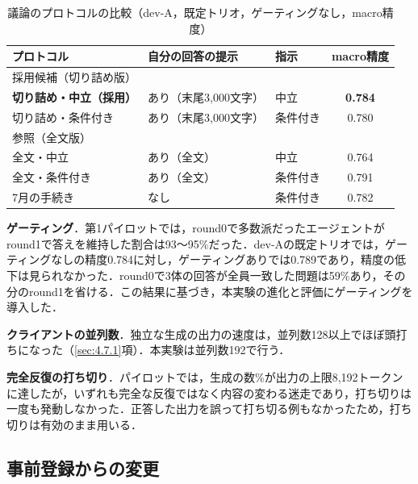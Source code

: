 \begin{table}[htbp]
\caption{議論のプロトコルの比較（dev-A，既定トリオ，ゲーティングなし，macro精度）}
\label{tab:4.6}
\centering
\small
\begin{tabular}{|l|l|l|c|}
\hline
プロトコル & 自分の回答の提示 & 指示 & macro精度 \\
\hline
\multicolumn{4}{|l|}{採用候補（切り詰め版）} \\
\hline
\textbf{切り詰め・中立（採用）} & あり（末尾3,000文字） & 中立 & \textbf{0.784} \\
切り詰め・条件付き & あり（末尾3,000文字） & 条件付き & 0.780 \\
\hline
\multicolumn{4}{|l|}{参照（全文版）} \\
\hline
全文・中立 & あり（全文） & 中立 & 0.764 \\
全文・条件付き & あり（全文） & 条件付き & 0.791 \\
7月の手続き & なし & 条件付き & 0.782 \\
\hline
\end{tabular}
\end{table}

\textbf{ゲーティング}．第1パイロットでは，round0で多数派だったエージェントがround1で答えを維持した割合は93〜95\%だった．dev-Aの既定トリオでは，ゲーティングなしの精度0.784に対し，ゲーティングありでは0.789であり，精度の低下は見られなかった．round0で3体の回答が全員一致した問題は59\%あり，その分のround1を省ける．この結果に基づき，本実験の進化と評価にゲーティングを導入した．

\textbf{クライアントの並列数}．独立な生成の出力の速度は，並列数128以上でほぼ頭打ちになった（\ref{sec:4.7.1}項）．本実験は並列数192で行う．

\textbf{完全反復の打ち切り}．パイロットでは，生成の数\%が出力の上限8,192トークンに達したが，いずれも完全な反復ではなく内容の変わる迷走であり，打ち切りは一度も発動しなかった．正答した出力を誤って打ち切る例もなかったため，打ち切りは有効のまま用いる．

\subsection{事前登録からの変更}
\label{sec:4.6.3}


